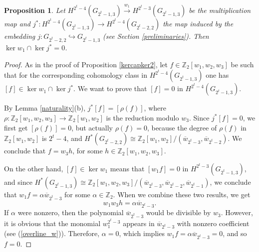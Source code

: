 \documentclass{amsart}
\newtheorem{proposition}[theorem]{Proposition}
\theoremstyle{definition}
\theoremstyle{remark}
\numberwithin{equation}{section}
\begin{document}
\begin{proposition}\label{kercapker1}
    Let $H^{2^t-4}(G_{2^t-1,3})\stackrel{w_1}\longrightarrow H^{2^t-3}(G_{2^t-1,3})$ be the multiplication map and $j^*:H^{2^t-4}(G_{2^t-1,3})\rightarrow H^{2^t-4}(G_{2^t-2,2})$ the map induced by the embedding $j:G_{2^t-2,2}\hookrightarrow G_{2^t-1,3}$ (see Section \ref{preliminaries}). Then
    $\ker w_1\cap \ker j^* = 0$.
\end{proposition}
\begin{proof} As in the proof of Proposition \ref{kercapker2}, let $f\in\mathbb Z_2[w_1,w_2,w_3]$ be such that for the corresponding cohomology class in $H^{2^t-4}(G_{2^t-1,3})$ one has $[f]\in \ker w_1\cap \ker j^*$. We want to prove that $[f]=0$ in $H^{2^t-4}(G_{2^t-1,3})$.

By Lemma \ref{naturality}(b), $j^*[f] = [\rho(f)]$, where $\rho:\mathbb Z_2[w_1,w_2,w_3]\rightarrow\mathbb Z_2[w_1,w_2]$ is the reduction modulo $w_3$. Since $j^*[f] = 0$, we first get $[\rho(f)]=0$, but actually $\rho(f)=0$, because the degree of $\rho(f)$ in $\mathbb Z_2[w_1,w_2]$ is $2^t-4$, and $H^*(G_{2^t-2,2})\cong\mathbb Z_2[w_1,w_2]/(\overline w_{2^t-3},\overline w_{2^t-2})$. We conclude that $f=w_3h$, for some $h\in\mathbb Z_2[w_1,w_2,w_3]$.

On the other hand, $[f]\in \ker w_1$ means that $[w_1f] = 0$ in $H^{2^t-3}(G_{2^t-1,3})$, and since $H^*(G_{2^t-1,3})\cong\mathbb Z_2[w_1,w_2,w_3]/(\overline w_{2^t-3},\overline w_{2^t-2},\overline w_{2^t-1})$, we conclude that $w_1f = \alpha \overline w_{2^t-3}$ for some $\alpha\in\mathbb Z_2$. When we combine these two results, we get 
\[w_1w_3h = \alpha \overline w_{2^t-3}.\]
If $\alpha$  were nonzero, then the polynomial $\overline w_{2^t-3}$ would be divisible by $w_3$. However, it is obvious that the monomial $w_1^{2^t-3}$ appears in $\overline w_{2^t-3}$ with nonzero coefficient (see (\ref{overline_w})). Therefore, $\alpha = 0$, which implies $w_1f = \alpha \overline w_{2^t-3}=0$, and so $f=0$.
\end{proof}
\end{document}
